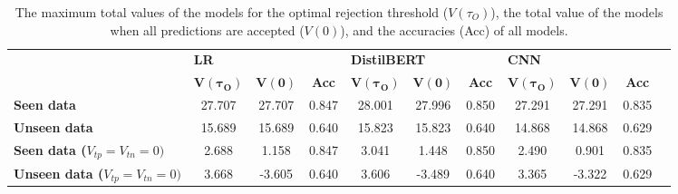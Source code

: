 \begin{table}
    \scriptsize
    \centering
    \begin{tabular}{lcccccccccc}
        \toprule
                                                 & \multicolumn{3}{l}{\textbf{LR}} & \multicolumn{3}{l}{\textbf{DistilBERT}} & \multicolumn{3}{l}{\textbf{CNN}}                                                                                                                                 \\
        \cmidrule(l){2-4} \cmidrule(l){5-7} \cmidrule(l){8-10}
                                                 & $\boldsymbol{V(\tau_O)}$        & $\boldsymbol{V(0)}$                     & \textbf{Acc}                     & $\boldsymbol{V(\tau_O)}$ & $\boldsymbol{V(0)}$ & \textbf{Acc} & $\boldsymbol{V(\tau_O)}$ & $\boldsymbol{V(0)}$ & \textbf{Acc} \\
        \midrule
        \textbf{Seen data}                       & 27.707                          & 27.707                                  & 0.847                            & 28.001                   & 27.996              & 0.850        & 27.291                   & 27.291              & 0.835        \\
        \textbf{Unseen data}                     & 15.689                          & 15.689                                  & 0.640                            & 15.823                   & 15.823              & 0.640        & 14.868                   & 14.868              & 0.629        \\
        \midrule
        \textbf{Seen data ($V_{tp}=V_{tn}=0)$}   & 2.688                           & 1.158                                   & 0.847                            & 3.041                    & 1.448               & 0.850        & 2.490                    & 0.901               & 0.835        \\
        \textbf{Unseen data ($V_{tp}=V_{tn}=0)$} & 3.668                           & -3.605                                  & 0.640                            & 3.606                    & -3.489              & 0.640        & 3.365                    & -3.322              & 0.629        \\
        \bottomrule
    \end{tabular}
    \caption{The maximum total values of the models for the optimal rejection threshold ($V(\tau_O)$), the total value of the models when all predictions are accepted ($V(0)$), and the accuracies (Acc) of all models.}
    \label{tab:metric2}
\end{table}